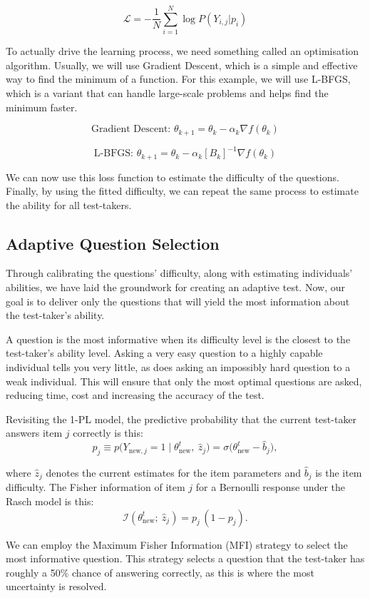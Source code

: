 \documentclass{article}
\begin{document}
\[
\mathcal{L} = -\frac{1}{N} \sum_{i=1}^{N}\log P(Y_{i,j} | p_i)
\]

To actually drive the learning process, we need something called an optimisation algorithm. Usually, we will use Gradient Descent, which is a simple and effective way to find the minimum of a function. For this example, we will use L-BFGS, which is a variant that can handle large-scale problems and helps find the minimum faster.

\[
\text{Gradient Descent: } \theta_{k+1} = \theta_k - \alpha_k \nabla f(\theta_k)
\]

\[
\text{L-BFGS: } \theta_{k+1} = \theta_k - \alpha_k [B_k]^{-1} \nabla f(\theta_k)
\]

We can now use this loss function to estimate the difficulty of the questions. Finally, by using the fitted difficulty, we can repeat the same process to estimate the ability for all test-takers.

\subsection*{Adaptive Question Selection}

Through calibrating the questions' difficulty, along with estimating individuals' abilities, we have laid the groundwork for creating an adaptive test. Now, our goal is to deliver only the questions that will yield the most information about the test-taker's ability.

A question is the most informative when its difficulty level is the closest to the test-taker's ability level. Asking a very easy question to a highly capable individual tells you very little, as does asking an impossibly hard question to a weak individual. This will ensure that only the most optimal questions are asked, reducing time, cost and increasing the accuracy of the test.

Revisiting the 1-PL model, the predictive probability that the current test-taker answers item $j$ correctly is this:
\[
p_j \equiv p\big(Y_{\text{new},j}=1\mid \theta^{t}_{\text{new}},\ \hat z_j\big)
= \sigma\big(\theta^{t}_{\text{new}} - \hat b_j\big),
\]

where $\hat z_j$ denotes the current estimates for the item parameters and $\hat b_j$ is the item difficulty. The Fisher information of item $j$ for a Bernoulli response under the Rasch model is this:
\[
\mathcal I\!\left(\theta^{t}_{\text{new}};\ \hat z_j\right)
= p_j\,(1-p_j).
\tag{1}
\]

We can employ the Maximum Fisher Information (MFI) strategy to select the most informative question. This strategy selects a question that the test-taker has roughly a 50\% chance of answering correctly, as this is where the most uncertainty is resolved.
\end{document}
